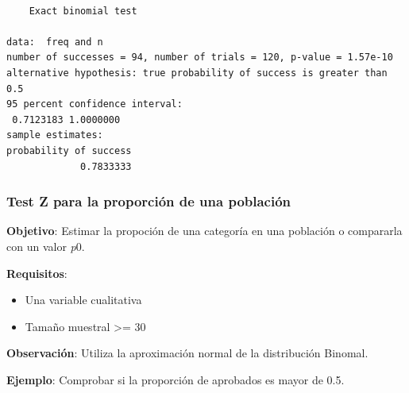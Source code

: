 \documentclass[
  a4paper,
]{scrreport}
\newenvironment{Shaded}{\begin{snugshade}}{\end{snugshade}}
\newcommand{\AttributeTok}[1]{\textcolor[rgb]{0.40,0.45,0.13}{#1}}
\newcommand{\FloatTok}[1]{\textcolor[rgb]{0.68,0.00,0.00}{#1}}
\newcommand{\FunctionTok}[1]{\textcolor[rgb]{0.28,0.35,0.67}{#1}}
\newcommand{\NormalTok}[1]{\textcolor[rgb]{0.00,0.23,0.31}{#1}}
\newcommand{\OtherTok}[1]{\textcolor[rgb]{0.00,0.23,0.31}{#1}}
\newcommand{\SpecialCharTok}[1]{\textcolor[rgb]{0.37,0.37,0.37}{#1}}
\newcommand{\StringTok}[1]{\textcolor[rgb]{0.13,0.47,0.30}{#1}}
\providecommand{\tightlist}{%
  \setlength{\itemsep}{0pt}\setlength{\parskip}{0pt}}\usepackage{longtable,booktabs,array}
\theoremstyle{definition}
\theoremstyle{definition}
\theoremstyle{remark}
\begin{document}
\begin{Shaded}
\end{Shaded}

\begin{verbatim}

    Exact binomial test

data:  freq and n
number of successes = 94, number of trials = 120, p-value = 1.57e-10
alternative hypothesis: true probability of success is greater than 0.5
95 percent confidence interval:
 0.7123183 1.0000000
sample estimates:
probability of success 
             0.7833333 
\end{verbatim}

\hypertarget{test-z-para-la-proporciuxf3n-de-una-poblaciuxf3n}{%
\subsubsection{Test Z para la proporción de una
población}\label{test-z-para-la-proporciuxf3n-de-una-poblaciuxf3n}}

\textbf{Objetivo}: Estimar la propoción de una categoría en una
población o compararla con un valor \emph{p}0.

\textbf{Requisitos}:

\begin{itemize}
\tightlist
\item
  Una variable cualitativa
\item
  Tamaño muestral \textgreater= 30
\end{itemize}

\textbf{Observación}: Utiliza la aproximación normal de la distribución
Binomal.

\textbf{Ejemplo}: Comprobar si la proporción de aprobados es mayor de
0.5.

\begin{Shaded}
\end{Shaded}
\end{document}
